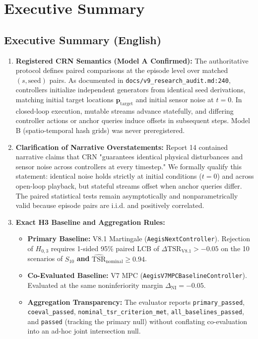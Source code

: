 \documentclass[10pt,a4paper]{article}
\begin{document}
\section{Executive Summary}

\subsection{Executive Summary (English)}
\begin{enumerate}
    \item \textbf{Registered CRN Semantics (Model A Confirmed):} The authoritative protocol defines paired comparisons at the episode level over matched $(s, \text{seed})$ pairs. As documented in \texttt{docs/v9\_research\_audit.md:240}, controllers initialize independent generators from identical seed derivations, matching initial target locations $\mathbf{p}_{\mathrm{target}}$ and initial sensor noise at $t=0$. In closed-loop execution, mutable streams advance statefully, and differing controller actions or anchor queries induce offsets in subsequent steps. Model B (spatio-temporal hash grids) was never preregistered.
    \item \textbf{Clarification of Narrative Overstatements:} Report 14 contained narrative claims that CRN "guarantees identical physical disturbances and sensor noise across controllers at every timestep." We formally qualify this statement: identical noise holds strictly at initial conditions ($t=0$) and across open-loop playback, but stateful streams offset when anchor queries differ. The paired statistical tests remain asymptotically and nonparametrically valid because episode pairs are i.i.d. and positively correlated.
    \item \textbf{Exact H3 Baseline and Aggregation Rules:}
    \begin{itemize}
        \item \textbf{Primary Baseline:} V8.1 Martingale (\texttt{AegisNextController}). Rejection of $H_{0,3}$ requires 1-sided 95\% paired LCB of $\Delta\mathrm{TSR}_{\mathrm{V8.1}} > -0.05$ on the 10 scenarios of $S_{10}$ \textbf{and} $\widehat{\mathrm{TSR}}_{\mathrm{nominal}} \ge 0.94$.
        \item \textbf{Co-Evaluated Baseline:} V7 MPC (\texttt{AegisV7MPCBaselineController}). Evaluated at the same noninferiority margin $\Delta_{\mathrm{NI}} = -0.05$.
        \item \textbf{Aggregation Transparency:} The evaluator reports \texttt{primary\_passed}, \texttt{coeval\_passed}, \texttt{nominal\_tsr\_criterion\_met}, \texttt{all\_baselines\_passed}, and \texttt{passed} (tracking the primary null) without conflating co-evaluation into an ad-hoc joint intersection null.

\end{itemize}
\end{enumerate}
\end{document}
